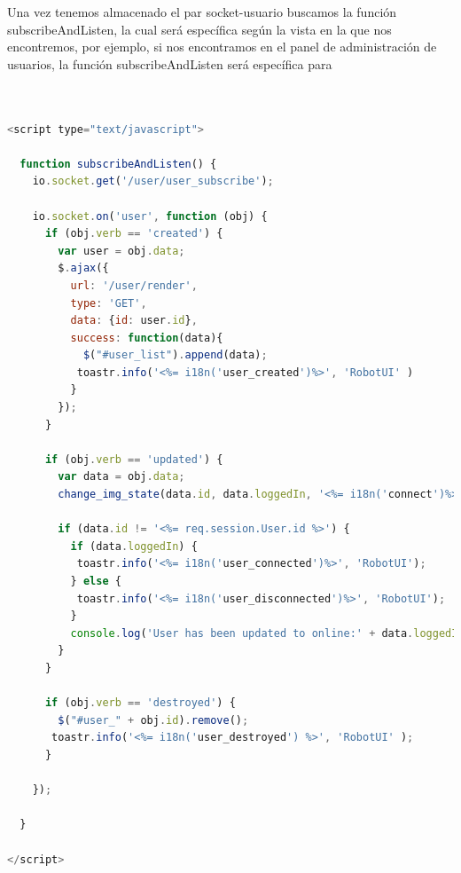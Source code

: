 Una vez tenemos almacenado el par socket-usuario buscamos la función subscribeAndListen, la cual será específica según la vista en la que nos encontremos, por ejemplo, si nos encontramos en el panel
de administración de usuarios, la función subscribeAndListen será específica para 


\begin{lstlisting}[language=JavaScript]


<script type="text/javascript">

  function subscribeAndListen() {
    io.socket.get('/user/user_subscribe');

    io.socket.on('user', function (obj) {
      if (obj.verb == 'created') {
        var user = obj.data;
        $.ajax({
          url: '/user/render',
          type: 'GET',
          data: {id: user.id},
          success: function(data){
            $("#user_list").append(data);
           toastr.info('<%= i18n('user_created')%>', 'RobotUI' )
          }
        });
      }

      if (obj.verb == 'updated') {
        var data = obj.data;
        change_img_state(data.id, data.loggedIn, '<%= i18n('connect')%>', '<%= i18n('disconnect')%>');

        if (data.id != '<%= req.session.User.id %>') {
          if (data.loggedIn) {
           toastr.info('<%= i18n('user_connected')%>', 'RobotUI');
          } else {
           toastr.info('<%= i18n('user_disconnected')%>', 'RobotUI');
          }
          console.log('User has been updated to online:' + data.loggedIn);
        }
      }

      if (obj.verb == 'destroyed') {
        $("#user_" + obj.id).remove();
       toastr.info('<%= i18n('user_destroyed') %>', 'RobotUI' );
      }

    });

  }

</script>

\end{lstlisting}





